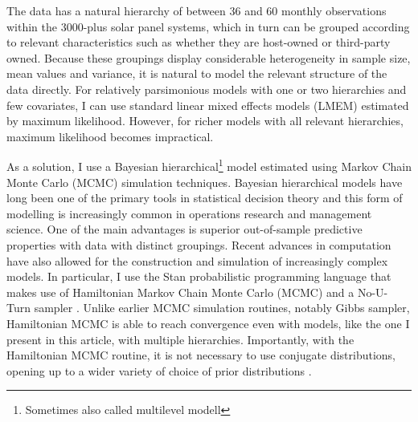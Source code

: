 \documentclass[a4paper]{article}
\begin{document}
The data has a natural hierarchy of between 36 and 60 monthly observations within the 3000-plus solar panel systems, which in turn can be grouped according to relevant characteristics such as whether they are host-owned or third-party owned. Because these groupings display considerable heterogeneity in sample size, mean values and variance, it is natural to model the relevant structure of the data directly. For relatively parsimonious models with one or two hierarchies and few covariates, I can use standard linear mixed effects models (LMEM) estimated by maximum likelihood. However, for richer models with all relevant hierarchies, maximum likelihood becomes impractical.


As a solution, I use a Bayesian hierarchical\footnote{Sometimes also called multilevel modell} model estimated using Markov Chain Monte Carlo (MCMC) simulation techniques. Bayesian hierarchical models have long been one of the primary tools in statistical decision theory \citep{berger_statistical_1985} and this form of modelling is increasingly common in operations research and management science. One of the main advantages is superior out-of-sample predictive properties with data with distinct groupings. Recent advances in computation have also allowed for the construction and simulation of increasingly complex models. In particular, I use the Stan probabilistic programming language \citep{stan_development_team_stan_2014} that makes use of Hamiltonian Markov Chain Monte Carlo (MCMC) \citep{mackay_information_2003} and a No-U-Turn sampler \citep{homan_no-u-turn_2014}. Unlike earlier MCMC simulation routines, notably Gibbs sampler, Hamiltonian MCMC is able to reach convergence even with models, like the one I present in this article, with multiple hierarchies. Importantly, with the Hamiltonian MCMC routine, it is not necessary to use conjugate distributions, opening up to a wider variety of choice of prior distributions \citep{kruschke_doing_2014}.
\end{document}
